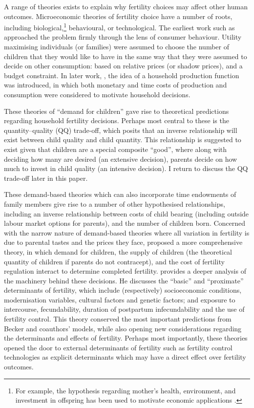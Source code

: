 \documentclass{article}
\begin{document}
\begin{spacing}{1.4}
A range of theories exists to explain why fertility choices may affect other 
human outcomes.  Microeconomic theories of fertility choice have a number of
roots, including biological,\footnote{For example, the \citet{TriversWillard1973}
hypothesis regarding mother's health, environment, and investment in offspring
has been used to motivate economic applications \citep{AlmondEdlund2007}.}
behavioural, or technological. The earliest work such as \citet{Becker1960} 
approached the problem firmly through the lens of consumer behaviour.  Utility 
maximising individuals (or families) were assumed to choose the number of 
children that they would like to have in the same way that they were assumed to 
decide on other consumption: based on relative prices (or shadow prices), and a 
budget constraint.  In later work, \citep{Becker1965}, the idea of a household 
production function was introduced, in which both monetary and time costs of 
production and consumption were considered to motivate household decisions.

These theories of ``demand for children'' gave rise to theoretical predictions 
regarding household fertility decisions.  Perhaps most central to these is the
quantity--quality (QQ) trade-off, which posits that an inverse relationship
will exist between child quality and child quantity.  This relationship is
suggested to exist given that children are a special composite ``good'', where 
along with deciding how many are desired (an extensive decision), parents decide 
on how much to invest in child quality (an intensive decision).  I return to 
discuss the QQ trade-off later in this paper.

These demand-based theories which can also incorporate time endowments of 
family members give rise to a number of other hypothesised relationships, 
including an inverse relationship between costs of child bearing (including 
outside labour market options for parents), and the number of children born.  
Concerned with the narrow nature of demand-based theories where all variation 
in fertility is due to parental tastes and the prices they face, 
\citet{Easterlin1975} proposed a more comprehensive theory, in which demand for 
children, the supply of children (the theoretical quantity of children if 
parents do not contracept), and the cost of fertility regulation interact to 
determine completed fertility. \citeauthor{Easterlin1975} provides a 
deeper analysis of the machinery behind these decisions.  He discusses the 
``basic'' and ``proximate'' determinants of fertility, which include 
(respectively) socioeconomic conditions, modernisation variables, cultural 
factors and genetic factors; and exposure to intercourse, fecundability, 
duration of postpartum infecundability and the use of fertility control. This 
theory conserved the most important predictions from Becker and coauthors' 
models, while also opening new considerations regarding the determinants and 
effects of fertility.  Perhaps most importantly, these theories opened the 
door to external determinants of fertility such as fertility control 
technologies as explicit determinants which may have a direct effect over 
fertility outcomes.


\end{spacing}
\end{document}
